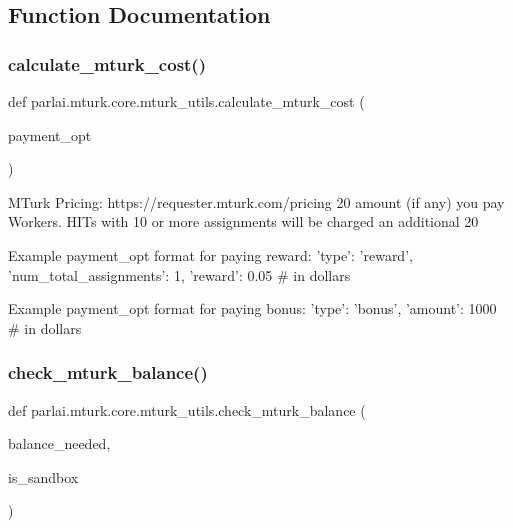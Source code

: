 \subsection{Function Documentation}
\mbox{\label{namespaceparlai_1_1mturk_1_1core_1_1mturk__utils_a4add40f6a463a3feb100a3c960ba3405}} 
\subsubsection{\texorpdfstring{calculate\+\_\+mturk\+\_\+cost()}{calculate\_mturk\_cost()}}
{\footnotesize\ttfamily def parlai.\+mturk.\+core.\+mturk\+\_\+utils.\+calculate\+\_\+mturk\+\_\+cost (\begin{DoxyParamCaption}\item[{}]{payment\+\_\+opt }\end{DoxyParamCaption})}

\begin{DoxyVerb}MTurk Pricing: https://requester.mturk.com/pricing 20%
amount (if any) you pay Workers. HITs with 10 or more assignments will be charged an
additional 20%

Example payment_opt format for paying reward:
{
    'type': 'reward',
    'num_total_assignments': 1,
    'reward': 0.05  # in dollars
}

Example payment_opt format for paying bonus:
{
    'type': 'bonus',
    'amount': 1000  # in dollars
}
\end{DoxyVerb}
 \mbox{\label{namespaceparlai_1_1mturk_1_1core_1_1mturk__utils_a68fb1962cbfa751d20f701da94ada62b}} 
\subsubsection{\texorpdfstring{check\+\_\+mturk\+\_\+balance()}{check\_mturk\_balance()}}
{\footnotesize\ttfamily def parlai.\+mturk.\+core.\+mturk\+\_\+utils.\+check\+\_\+mturk\+\_\+balance (\begin{DoxyParamCaption}\item[{}]{balance\+\_\+needed,  }\item[{}]{is\+\_\+sandbox }\end{DoxyParamCaption})}

